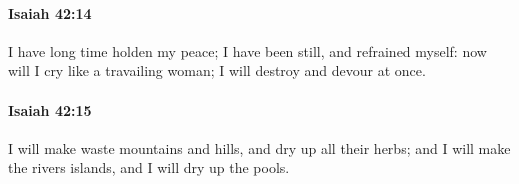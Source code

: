 		\paragraph{Isaiah 42:14} %
			\label{ISAIAH-42-14}

			I have long time holden my peace; I have been still, and refrained myself: now will I cry like a travailing woman; I will destroy and devour at once.


		\paragraph{Isaiah 42:15} %
			\label{ISAIAH-42-15}

			I will make waste mountains and hills, and dry up all their herbs; and I will make the rivers islands, and I will dry up the pools.


